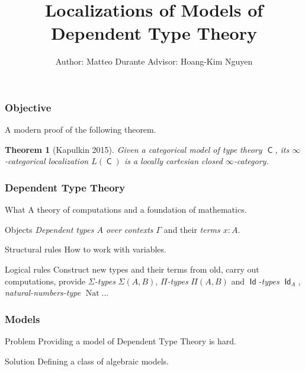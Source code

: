 \documentclass{beamer}
\title{Localizations of Models of Dependent Type Theory}
\author{Author: Matteo Durante \quad\quad\quad Advisor: Hoang-Kim Nguyen}
\institute{Regensburg University}
\DeclareMathOperator{\Id}{\mathsf{Id}}
\DeclareMathOperator{\sfC}{\mathsf{C}}
\DeclareMathOperator{\nat}{Nat}
\begin{document}
\theoremstyle{plain}

\newtheorem{thm}{Theorem}[section]
\newtheorem{prop}{Proposition}[section]
\newtheorem{defn}{Definition}[section]
\newtheorem{conj}{Conjecture}[section]
\newtheorem{lem}{Lemma}[section]

\frame{\titlepage}

\begin{frame}
  \frametitle{Objective}

  A modern proof of the following theorem.

  \begin{thm}[Kapulkin 2015]
    Given a categorical model of type theory $\sfC$, its $\infty$-categorical
    localization $L(\sfC)$ is a locally cartesian closed $\infty$-category.
  \end{thm}
\end{frame}

\begin{frame}
  \frametitle{Dependent Type Theory}
  
  \begin{block}{What}
    A theory of computations and a foundation of mathematics.
  \end{block}

  \begin{block}{Objects}
    \emph{Dependent types $A$ over contexts
    $\Gamma$} and their \emph{terms $x:A$}.
  \end{block}

  \begin{block}{Structural rules}
    How to work with variables.
  \end{block}

  \begin{block}{Logical rules}
    Construct new types and their terms from old, carry out
    computations, provide \emph{$\Sigma$-types} $\Sigma(A,B)$, \emph{$\Pi$-types}
    $\Pi(A,B)$ and \emph{$\Id$-types} $\Id_A$, \emph{natural-numbers-type}
    $\nat$...
  \end{block}
\end{frame}

\begin{frame}
  \frametitle{Models}

  \begin{block}{Problem}
    Providing a model of Dependent Type Theory is hard.
  \end{block}

  \begin{block}{Solution}
    Defining a class of algebraic models.
  \end{block}
\end{frame}
\end{document}

